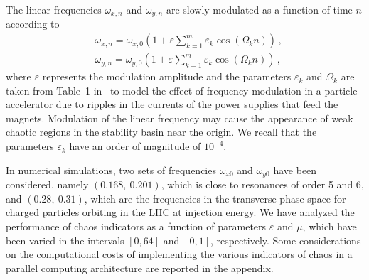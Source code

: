 The linear frequencies $\omega_{x, n}$ and $\omega_{y, n}$ are slowly modulated as a function of time $n$ according to
\begin{equation}
    \begin{aligned}
    &\omega_{x, n}=\omega_{x, 0}\left(1+\varepsilon \sum_{k=1}^{m} \varepsilon_{k} \cos \left(\Omega_{k} n\right)\right) \,, \\
    &\omega_{y, n}=\omega_{y, 0}\left(1+\varepsilon \sum_{k=1}^{m} \varepsilon_{k} \cos \left(\Omega_{k} n\right)\right) \,,
    \end{aligned}
\end{equation}
where $\varepsilon$ represents the modulation amplitude and the parameters $\varepsilon_k$ and $\Omega_k$ are taken from Table~1 in~\cite{invlog} to model the effect of frequency modulation in a particle accelerator due to ripples in the currents of the power supplies that feed the magnets. Modulation of the linear frequency may cause the appearance of weak chaotic regions in the stability basin near the origin. 
We recall that the parameters $\varepsilon_k$ have an order of magnitude of $10^{-4}$.

In numerical simulations, two sets of frequencies $\omega_{x0}$ and $\omega_{y0}$ have been considered, namely $(0.168,\ 0.201)$, which is close to resonances of order 5 and 6, and $(0.28,\ 0.31)$, which are the frequencies in the transverse phase space for charged particles orbiting in the LHC at injection energy.
We have analyzed the performance of chaos indicators as a function of parameters $\varepsilon$ and $\mu$, which have been varied in the intervals $[0,64]$ and $[0,1]$, respectively. Some considerations on the computational costs of implementing the various indicators of chaos in a parallel computing architecture are reported in the appendix. 



